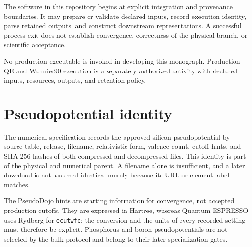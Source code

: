 
The software in this repository begins at explicit integration and provenance
boundaries. It may prepare or validate declared inputs, record execution
identity, parse retained outputs, and construct downstream representations. A
successful process exit does not establish convergence, correctness of the
physical branch, or scientific acceptance.

No production executable is invoked in developing this monograph. Production
QE and Wannier90 execution is a separately authorized activity with declared
inputs, resources, outputs, and retention policy.

\section{Pseudopotential identity}


The numerical specification records the approved silicon pseudopotential by
source table, release, filename, relativistic form, valence count, cutoff hints,
and SHA-256 hashes of both compressed and decompressed files. This identity is
part of the physical and numerical parent. A filename alone is insufficient,
and a later download is not assumed identical merely because its URL or element
label matches.

The PseudoDojo hints are starting information for convergence, not accepted
production cutoffs. They are expressed in Hartree, whereas Quantum ESPRESSO
uses Rydberg for \texttt{ecutwfc}; the conversion and the units of every
recorded setting must therefore be explicit. Phosphorus and boron
pseudopotentials are not selected by the bulk protocol and belong to their
later specialization gates.


